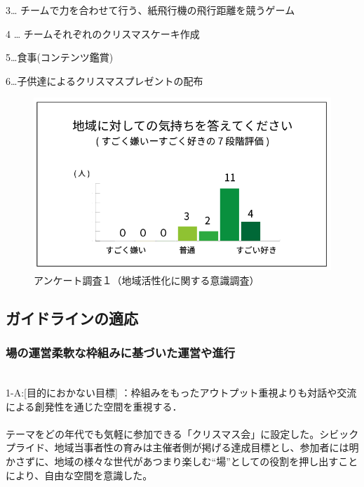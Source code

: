 \documentclass[a4paper]{jsarticle}
\begin{document}
\item 3… チームで力を合わせて行う、紙飛行機の飛行距離を競うゲーム

\item 4 … チームそれぞれのクリスマスケーキ作成


\item 5…食事(コンテンツ鑑賞)

\item 6…子供達によるクリスマスプレゼントの配布\\
\begin{figure}[h]
  \begin{center}
    \includegraphics[width=0.95\hsize]{./images/03}
    \caption{アンケート調査１（地域活性化に関する意識調査）}
    \label{fig:tmu_hino}
  \end{center}
\end{figure}

\subsection{ガイドラインの適応}
\subsubsection{場の運営柔軟な枠組みに基づいた運営や進行}\\
1-A:[目的におかない目標] ：枠組みをもったアウトプット重視よりも対話や交流による創発性を通じた空間を重視する．\\\\
テーマをどの年代でも気軽に参加できる「クリスマス会」に設定した。シビックプライド、地域当事者性の育みは主催者側が掲げる達成目標とし、参加者には明かさずに、地域の様々な世代があつまり楽しむ“場”としての役割を押し出すことにより、自由な空間を意識した。\\\\
\end{document}
